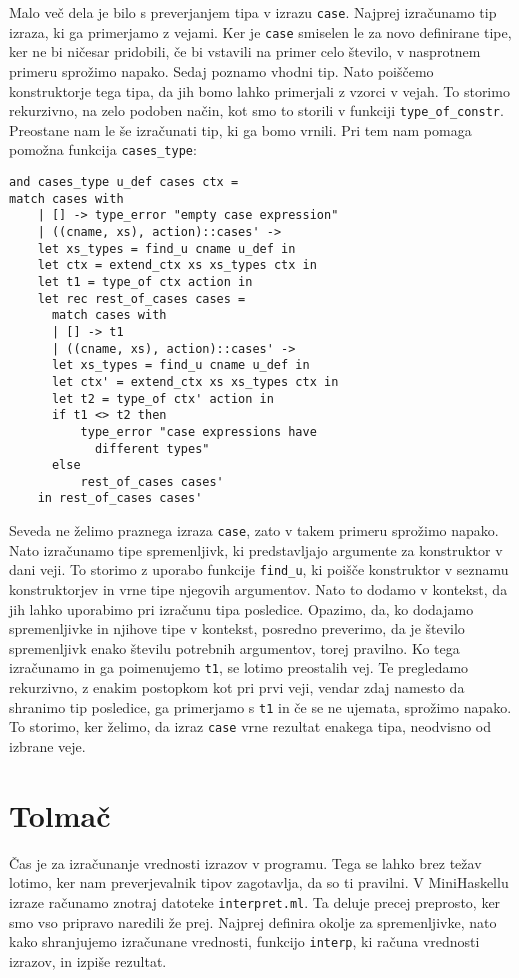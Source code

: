 \documentclass[12pt,a4paper,openany]{book}
\begin{document}
Malo več dela je bilo s preverjanjem tipa v izrazu \lstinline{case}. Najprej izračunamo tip izraza, ki ga primerjamo z vejami. Ker je \lstinline{case} smiselen le za novo definirane tipe, ker ne bi ničesar 
pridobili, če bi vstavili na primer celo število, v nasprotnem primeru sprožimo napako. Sedaj poznamo vhodni tip. Nato poiščemo konstruktorje tega tipa, da jih bomo lahko primerjali z vzorci v vejah.
To storimo rekurzivno, na zelo podoben način, kot smo to storili v funkciji \lstinline{type_of_constr}. Preostane nam le še izračunati tip, ki ga bomo vrnili. Pri tem nam pomaga pomožna funkcija 
\lstinline{cases_type}:
\begin{lstlisting}
and cases_type u_def cases ctx =
match cases with
    | [] -> type_error "empty case expression"
    | ((cname, xs), action)::cases' ->
    let xs_types = find_u cname u_def in
    let ctx = extend_ctx xs xs_types ctx in
    let t1 = type_of ctx action in
    let rec rest_of_cases cases =
      match cases with
      | [] -> t1
      | ((cname, xs), action)::cases' ->
      let xs_types = find_u cname u_def in
      let ctx' = extend_ctx xs xs_types ctx in
      let t2 = type_of ctx' action in
      if t1 <> t2 then
          type_error "case expressions have 
            different types"
      else
          rest_of_cases cases'
    in rest_of_cases cases'
\end{lstlisting}
Seveda ne želimo praznega izraza \lstinline{case}, zato v takem primeru sprožimo napako. Nato izračunamo tipe spremenljivk, ki predstavljajo argumente za konstruktor v dani veji. To storimo z uporabo
funkcije \lstinline{find_u}, ki poišče konstruktor v seznamu konstruktorjev in vrne tipe njegovih argumentov. Nato to dodamo v kontekst, da jih lahko uporabimo pri izračunu tipa posledice. Opazimo, 
da, ko dodajamo spremenljivke in njihove tipe v kontekst, posredno preverimo, da je število spremenljivk enako številu potrebnih argumentov, torej pravilno. Ko tega izračunamo in ga 
poimenujemo \lstinline{t1}, se lotimo preostalih vej. Te pregledamo rekurzivno, z enakim postopkom kot pri prvi veji, vendar zdaj namesto da shranimo tip posledice, ga primerjamo s \lstinline{t1} in če 
se ne ujemata, sprožimo napako. To storimo, ker želimo, da izraz \lstinline{case} vrne rezultat enakega tipa, neodvisno od izbrane veje.

\section{Tolmač}
Čas je za izračunanje vrednosti izrazov v programu. Tega se lahko brez težav lotimo, ker nam preverjevalnik tipov zagotavlja, da so ti pravilni. V MiniHaskellu izraze računamo znotraj datoteke 
\lstinline{interpret.ml}. Ta deluje precej preprosto, ker smo vso pripravo naredili že prej. Najprej definira okolje za spremenljivke, nato kako shranjujemo izračunane vrednosti, funkcijo 
\lstinline{interp}, ki računa vrednosti izrazov, in izpiše rezultat. 
\end{document}
